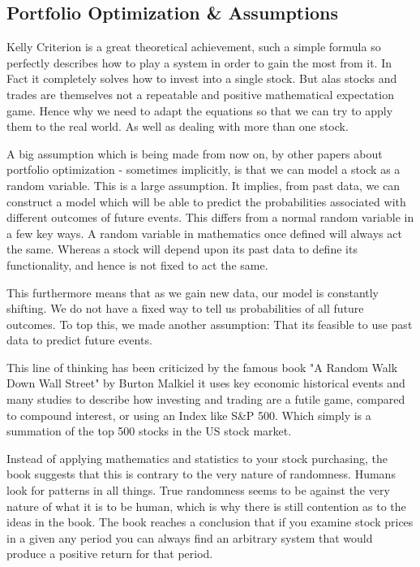 \documentclass[11pt]{article}
\begin{document}
\subsection{Portfolio Optimization \& Assumptions}

    Kelly Criterion \cite{Kelly} is a great theoretical achievement, such a simple formula so
    perfectly describes how to play a system in order to gain the most from it. In Fact
    it completely solves how to invest into a single stock. But alas
    stocks and trades are themselves not a repeatable and positive mathematical expectation
    game. Hence why we need to adapt the equations so that we can try to apply them to the
    real world. As well as dealing with more than one stock.

    A big assumption which is being made from now on, by other papers about portfolio optimization - sometimes implicitly,
    is that we can model a stock as a random variable. This is a large assumption. It
    implies, from past data, we can construct a model which will be able
    to predict the probabilities associated with different outcomes of future events.
    This differs from a normal random variable in a few key ways. A random variable in
    mathematics once defined will always act the same. Whereas a stock will
    depend upon its past data to define its functionality, and hence is not fixed to act
    the same.

    This furthermore means that as we gain new data, our model is constantly shifting.
    We do not have a fixed way to tell us probabilities of all future outcomes.
    To top this, we made another assumption: That its feasible to use past data to predict
    future events.

    This line of thinking has been criticized by the famous book "A Random Walk Down
    Wall Street" by Burton Malkiel \cite{BurtonMalkiel} it uses
    key economic historical events and many studies to describe how investing and trading are
    a futile game, compared to compound interest, or using an Index like S\&P 500. Which
    simply is a summation of the top 500 stocks in the US stock market.

    Instead of applying mathematics and statistics to your stock purchasing, the book
    suggests that this is contrary to the 
    very nature of randomness. Humans look for patterns in all things. True 
    randomness seems to be against the very nature of what it is to be human, which is why
    there is still contention as to the ideas in the book. The book reaches a conclusion that
    if you examine stock prices in a given any period you can always find an arbitrary
    system that would produce a positive return for that period.
\end{document}
